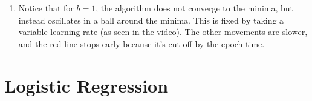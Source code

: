 \documentclass[12pt]{article}
\begin{document}
\begin{enumerate}[label=(\alph*)]
    \item \begin{center}\end{center}

    Notice that for $b=1$, the algorithm does not converge to the minima, but instead oscillates in a ball around the minima. This is fixed by taking a variable learning rate (as seen in the video). The other movements are slower, and the red line stops early because it's cut off by the epoch time.

\end{enumerate}

\pagebreak

\section*{Logistic Regression}
\end{document}
